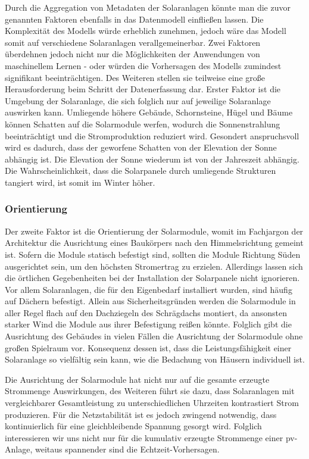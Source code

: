 \documentclass[12pt, a4paper]{article}
\begin{document}
Durch die Aggregation von Metadaten der Solaranlagen könnte man die zuvor genannten Faktoren ebenfalls in das Datenmodell einfließen lassen. Die Komplexität des Modells würde erheblich zunehmen, jedoch wäre das Modell somit auf verschiedene Solaranlagen verallgemeinerbar. Zwei Faktoren überdehnen jedoch nicht nur die Möglichkeiten der Anwendungen von maschinellem Lernen - oder würden die Vorhersagen des Modells zumindest signifikant beeinträchtigen. Des Weiteren stellen sie teilweise eine große Herausforderung beim Schritt der Datenerfassung dar. Erster Faktor ist die Umgebung der Solaranlage, die sich folglich nur auf jeweilige Solaranlage auswirken kann. Umliegende höhere Gebäude, Schornsteine, Hügel und Bäume können Schatten auf die Solarmodule werfen, wodurch die Sonnenstrahlung beeinträchtigt und die Stromproduktion reduziert wird. Gesondert anspruchsvoll wird es dadurch, dass der geworfene Schatten von der Elevation der Sonne abhängig ist. Die Elevation der Sonne wiederum ist von der Jahreszeit abhängig. Die Wahrscheinlichkeit, dass die Solarpanele durch umliegende Strukturen tangiert wird, ist somit im Winter höher. 

\subsubsection{Orientierung}

Der zweite Faktor ist die Orientierung der Solarmodule, womit im Fachjargon der Architektur die Ausrichtung eines Baukörpers nach den Himmelsrichtung gemeint ist. Sofern die Module statisch befestigt sind, sollten die Module Richtung Süden ausgerichtet sein, um den höchsten Stromertrag zu erzielen. Allerdings lassen sich die örtlichen Gegebenheiten bei der Installation der Solarpanele nicht ignorieren. Vor allem Solaranlagen, die für den Eigenbedarf installiert wurden, sind häufig auf Dächern befestigt. Allein aus Sicherheitsgründen werden die Solarmodule in aller Regel flach auf den Dachziegeln des Schrägdachs montiert, da ansonsten starker Wind die Module aus ihrer Befestigung reißen könnte. Folglich gibt die Ausrichtung des Gebäudes in vielen Fällen die Ausrichtung der Solarmodule ohne großen Spielraum vor. Konsequenz dessen ist, dass die Leistungsfähigkeit einer Solaranlage so vielfältig sein kann, wie die Bedachung von Häusern individuell ist.

Die Ausrichtung der Solarmodule hat nicht nur auf die gesamte erzeugte Strommenge Auswirkungen, des Weiteren führt sie dazu, dass Solaranlagen mit vergleichbarer Gesamtleistung zu unterschiedlichen Uhrzeiten kontrastiert Strom produzieren. Für die Netzstabilität ist es jedoch zwingend notwendig, dass kontinuierlich für eine gleichbleibende Spannung gesorgt wird. Folglich interessieren wir uns nicht nur für die kumulativ erzeugte Strommenge einer \ac{pv}-Anlage, weitaus spannender sind die Echtzeit-Vorhersagen. 
\end{document}
